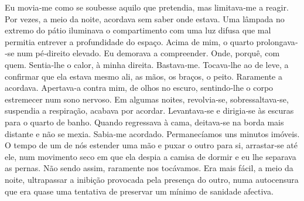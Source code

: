 Eu movia­‑me como se soubesse aquilo que pretendia, mas limitava­‑me a
reagir. Por vezes, a meio da noite, acordava sem saber onde estava. Uma
lâmpada no extremo do pátio iluminava o compartimento com uma luz difusa
que mal permitia entrever a profundidade do espaço. Acima de mim, o
quarto prolongava­‑se num pé­‑direito elevado. Eu demorava a
compreender. Onde, porquê, com quem. Sentia­‑lhe o calor, à minha
direita. Bastava­‑me. Tocava­‑lhe ao de leve, a confirmar que ela estava
mesmo ali, as mãos, os braços, o peito. Raramente a acordava.
Apertava­‑a contra mim, de olhos no escuro, sentindo­‑lhe o corpo
estremecer num sono nervoso. Em algumas noites, revolvia­‑se,
sobressaltava­‑se, suspendia a respiração, acabava por acordar.
Levantava­‑se e dirigia­‑se às escuras para o quarto de banho. Quando
regressava à cama, deitava­‑se na borda mais distante e não se mexia.
Sabia­‑me acordado. Permanecíamos uns minutos imóveis. O tempo de um de
nós estender uma mão e puxar o outro para si, arrastar­‑se até ele, num
movimento seco em que ela despia a camisa de dormir e eu lhe separava as
pernas. Não sendo assim, raramente nos tocávamos. Era mais fácil, a meio
da noite, ultrapassar a inibição provocada pela presença do outro, numa
autocensura que era quase uma tentativa de preservar um mínimo de
sanidade afectiva.

